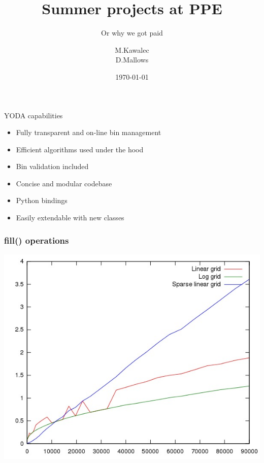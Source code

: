 \documentclass{beamer}
\title{Summer projects at PPE}
\subtitle{Or why we got paid}
\author{M.Kawalec \\ D.Mallows}
\date{\today}
\begin{document}
  \frame{\titlepage}



  \begin{frame}{YODA capabilities}
    \begin{itemize}[<uncover@+>]
      \item Fully transparent and on-line bin management
      \item Efficient algorithms used under the hood
      \item Bin validation included
      \item Concise and modular codebase
      \item Python bindings 
      \item Easily extendable with new classes
    \end{itemize}
  \end{frame}

  \begin{frame}
      \frametitle{fill() operations}
      \includegraphics[height=0.89\textheight]{1.jpg}
  \end{frame}
\end{document}
